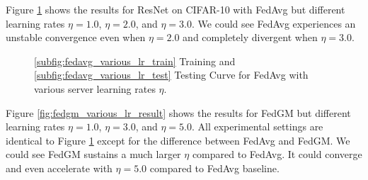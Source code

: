 Figure \ref{fig:fedavg_various_lr_result} shows the results for ResNet on CIFAR-10 with FedAvg but different learning rates $\eta=1.0$, $\eta=2.0$, and $\eta=3.0$. We could see FedAvg experiences an unstable convergence even when $\eta=2.0$ and completely divergent when $\eta=3.0$.

\begin{figure}[h]
\vspace*{-6pt}
\centering
{}
\vspace*{-6pt}
\caption{\ref{subfig:fedavg_various_lr_train} Training and \ref{subfig:fedavg_various_lr_test} Testing Curve for FedAvg with various server learning rates $\eta$.}
\label{fig:fedavg_various_lr_result}
\end{figure}

Figure \ref{fig:fedgm_various_lr_result} shows the results for FedGM but different learning rates $\eta=1.0$, $\eta=3.0$, and $\eta=5.0$. All experimental settings are identical to Figure \ref{fig:fedavg_various_lr_result} except for the difference between FedAvg and FedGM. We could see FedGM sustains a much larger $\eta$ compared to FedAvg. It could converge and even accelerate with $\eta=5.0$ compared to FedAvg baseline.


